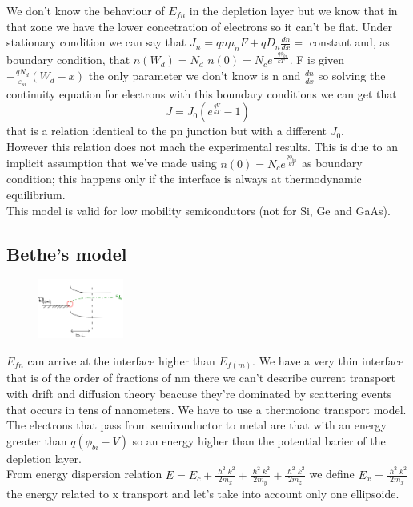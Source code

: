 We don't know the behaviour of $E_{fn}$ in the depletion layer but we know that in that zone we have the lower concetration of electrons so it can't be flat. Under stationary condition we can say that $ J_n=qn\mu_nF+qD_n \frac{dn}{dx}=$ constant and, as boundary condition, that $n(W_d)=N_d$ $n(0)=N_ce^{\frac{-q\phi_{bn}}{kT}}$. F is given $-\frac{qN_d}{\varepsilon_{si}}(W_d-x)$ the only parameter we don't know is n and $\frac{dn}{dx}$ so solving the continuity equation for electrons with this boundary conditions we can get that
\begin{equation}
J=J_0(e^{\frac{qV}{kT}}-1)
\end{equation}
that is a relation identical to the pn junction but with a different $J_0$.\\
However this relation does not mach the experimental results. This is due to an implicit assumption that we've made using $n(0)=N_ce^{\frac{q\phi_{bn}}{kT}}$ as boundary condition; this happens only if the interface is always at thermodynamic equilibrium.\\
This model is valid for low mobility semicondutors (not for Si, Ge and GaAs).\\
\subsection{Bethe's model}
\begin{figure}
\includegraphics[width=0.25\textwidth]{msne.png}
\end{figure}

$E_{fn}$ can arrive at the interface higher than $E_{f(m)}$. We have a very thin interface that is of the order of fractions of nm there we can't describe current transport with drift and diffusion theory beacuse they're dominated by scattering events that occurs in tens of nanometers. We have to use a thermoionc transport model.\\
The electrons that pass from semiconductor to metal are that with an energy greater than $q(\phi_{bi}-V)$ so an energy higher than the potential barier of the depletion layer.\\
From energy dispersion relation $E=E_c+\frac{\hslash^2k^2}{2m_x}+\frac{\hslash^2k^2}{2m_y}+\frac{\hslash^2k^2}{2m_z}$ we define $E_x=\frac{\hslash^2k^2}{2m_x}$ the energy related to x transport and let's take into account only one ellipsoide.\\

